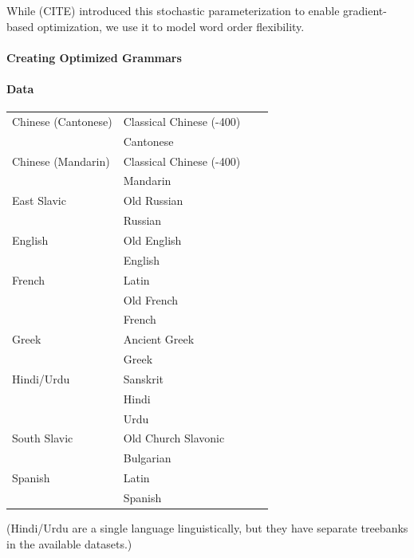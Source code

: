 \documentclass[11pt,a4paper]{article}
\begin{document}
While (CITE) introduced this stochastic parameterization to enable gradient-based optimization, we use it to model word order flexibility.

\paragraph{Creating Optimized Grammars}


\paragraph{Data}

\begin{tabular}{llll} \hline
Chinese (Cantonese) & Classical Chinese (-400)  \\
& Cantonese \\ \hline
Chinese (Mandarin) & Classical Chinese (-400)  \\
& Mandarin \\ \hline
East Slavic & Old Russian \\
& Russian \\ \hline
English & Old English \\
& English \\ \hline
French & Latin \\
& Old French \\
& French \\ \hline
Greek & Ancient Greek \\
& Greek \\ \hline
Hindi/Urdu & Sanskrit \\
& Hindi \\
& Urdu \\ \hline
South Slavic & Old Church Slavonic \\
& Bulgarian \\ \hline
Spanish & Latin \\
& Spanish \\ \hline
\end{tabular}

(Hindi/Urdu are a single language linguistically, but they have separate treebanks in the available datasets.)


\end{document}
